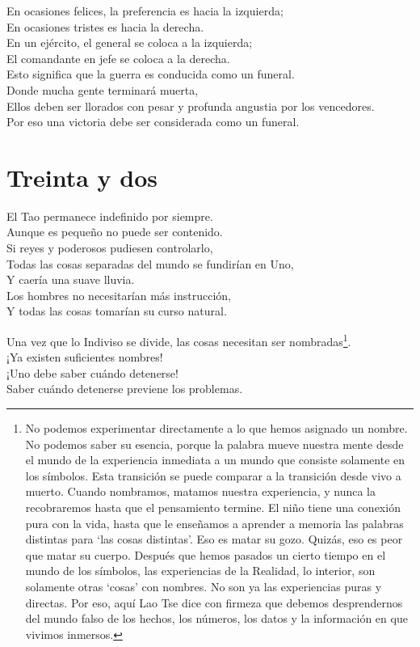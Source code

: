 \documentclass[book,b5paper,hidelinks,final]{memoir}
\begin{document}
	En ocasiones felices, la preferencia es hacia la izquierda;\\
	En ocasiones tristes es hacia la derecha.\\
	En un ejército, el general se coloca a la izquierda;\\
	El comandante en jefe se coloca a la derecha.\\
	Esto significa que la guerra es conducida como un funeral.\\
	Donde mucha gente terminará muerta,\\
	Ellos deben ser llorados con pesar y profunda angustia por los
	vencedores.\\
	Por eso una victoria debe ser considerada como un funeral.
	
	\chapter*{Treinta y dos}
	
	El Tao permanece indefinido por siempre.\\
	Aunque es pequeño no puede ser contenido.\\
	Si reyes y poderosos pudiesen controlarlo,\\
	Todas las cosas separadas del mundo se fundirían en Uno,\\
	Y caería una suave lluvia.\\
	Los hombres no necesitarían más instrucción,\\
	Y todas las cosas tomarían su curso natural.
	
	Una vez que lo Indiviso se divide, las cosas necesitan ser nombradas\footnote{No podemos experimentar directamente a lo que hemos asignado un
		nombre. No podemos saber su esencia, porque la palabra mueve nuestra
		mente desde el mundo de la experiencia inmediata a un mundo que consiste
		solamente en los símbolos. Esta transición se puede comparar a la
		transición desde vivo a muerto. Cuando nombramos, matamos nuestra
		experiencia, y nunca la recobraremos hasta que el pensamiento termine.
		El niño tiene una conexión pura con la vida, hasta que le enseñamos a
		aprender a memoria las palabras distintas para `las cosas distintas'.
		Eso es matar su gozo. Quizás, eso es peor que matar su cuerpo. Después
		que hemos pasados un cierto tiempo en el mundo de los símbolos, las
		experiencias de la Realidad, lo interior, son solamente otras `cosas'
		con nombres. No son ya las experiencias puras y directas. Por eso, aquí
		Lao Tse dice con firmeza que debemos desprendernos del mundo falso de
		los hechos, los números, los datos y la información en que vivimos
		inmersos.}.\\
	¡Ya existen suficientes nombres!\\
	¡Uno debe saber cuándo detenerse!\\
	Saber cuándo detenerse previene los problemas.
	
\end{document}
